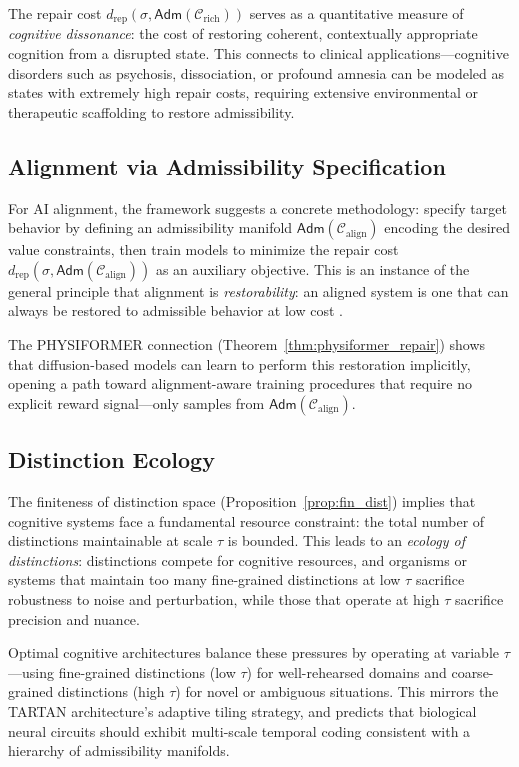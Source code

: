 \documentclass[a4paper,12pt]{article}
\theoremstyle{definition}
\newcommand{\Adm}{\mathsf{Adm}}
\newcommand{\dRP}{d_{\mathrm{rep}}}
\begin{document}
The repair cost $\dRP(\sigma, \Adm(\mathcal{C}_{\text{rich}}))$ serves as a quantitative measure of \emph{cognitive dissonance}: the cost of restoring coherent, contextually appropriate cognition from a disrupted state. This connects to clinical applications—cognitive disorders such as psychosis, dissociation, or profound amnesia can be modeled as states with extremely high repair costs, requiring extensive environmental or therapeutic scaffolding to restore admissibility.

\subsection{Alignment via Admissibility Specification}

For AI alignment, the framework suggests a concrete methodology: specify target behavior by defining an admissibility manifold $\Adm(\mathcal{C}_{\text{align}})$ encoding the desired value constraints, then train models to minimize the repair cost $\dRP(\sigma, \Adm(\mathcal{C}_{\text{align}}))$ as an auxiliary objective. This is an instance of the general principle that alignment is \emph{restorability}: an aligned system is one that can always be restored to admissible behavior at low cost \cite{Bostrom2003, Russell2010}.

The PHYSIFORMER connection (Theorem~\ref{thm:physiformer_repair}) shows that diffusion-based models can learn to perform this restoration implicitly, opening a path toward alignment-aware training procedures that require no explicit reward signal—only samples from $\Adm(\mathcal{C}_{\text{align}})$.

\subsection{Distinction Ecology}

The finiteness of distinction space (Proposition~\ref{prop:fin_dist}) implies that cognitive systems face a fundamental resource constraint: the total number of distinctions maintainable at scale $\tau$ is bounded. This leads to an \emph{ecology of distinctions}: distinctions compete for cognitive resources, and organisms or systems that maintain too many fine-grained distinctions at low $\tau$ sacrifice robustness to noise and perturbation, while those that operate at high $\tau$ sacrifice precision and nuance.

Optimal cognitive architectures balance these pressures by operating at variable $\tau$—using fine-grained distinctions (low $\tau$) for well-rehearsed domains and coarse-grained distinctions (high $\tau$) for novel or ambiguous situations. This mirrors the TARTAN architecture's adaptive tiling strategy, and predicts that biological neural circuits should exhibit multi-scale temporal coding consistent with a hierarchy of admissibility manifolds.
\end{document}
